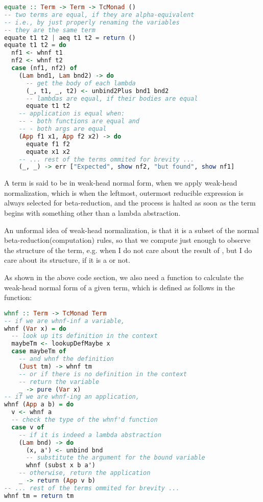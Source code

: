 \begin{lstlisting}[language=Haskell]
equate :: Term -> Term -> TcMonad ()
-- two terms are equal, if they are alpha-equivalent
-- i.e., by just properly renaming the variables
-- they are the same term
equate t1 t2 | aeq t1 t2 = return ()
equate t1 t2 = do
  nf1 <- whnf t1
  nf2 <- whnf t2
  case (nf1, nf2) of
    (Lam bnd1, Lam bnd2) -> do
      -- get the body of each lambda
      (_, t1, _, t2) <- unbind2Plus bnd1 bnd2
      -- lambdas are equal, if their bodies are equal
      equate t1 t2
    -- application is equal when:
    -- - both functions are equal and
    -- - both args are equal
    (App f1 x1, App f2 x2) -> do
      equate f1 f2
      equate x1 x2
    -- ... rest of the terms ommited for brevity ...
    (_, _) -> err ["Expected", show nf2, "but found", show nf1]
\end{lstlisting}


\begin{definition}
       A term is said to be in weak-head normal form, when we apply weak-head normalization, which is when the leftmost, outermost reducible expression is always selected for beta-reduction, and the process is halted as soon as the term begins with something other than a lambda abstraction.~\cite{advancedtapl}

       An unformal idea of weak-head normalization, is that it is a subset of the normal beta-reduction(computation) rules, so that we compute just enough to observe the structure of the term, e.g. when I do not care about the result of , but I do care about its structure, if it is a  or not.
\end{definition}

As shown in the above code section, we also need a function to calculate the weak-head normal form of a given term, which is defined as follows in the  function:

\begin{lstlisting}[language=Haskell]
whnf :: Term -> TcMonad Term
-- if we are whnf-inf a variable,
whnf (Var x) = do
  -- look up its definition in the context
  maybeTm <- lookupDefMaybe x
  case maybeTm of
    -- and whnf the definition
    (Just tm) -> whnf tm
    -- or if there is no definition in the context
    -- return the variable 
    _ -> pure (Var x)
-- if we are whnf-ing an application,
whnf (App a b) = do
  v <- whnf a
  -- check the type of the whnf'd function
  case v of
    -- if it is indeed a lambda abstraction
    (Lam bnd) -> do
      (x, a') <- unbind bnd
      -- substitute the argument for the bound variable
      whnf (subst x b a')
    -- otherwise, return the application
    _ -> return (App v b)
-- ... rest of the terms ommited for brevity ...
whnf tm = return tm
\end{lstlisting}

